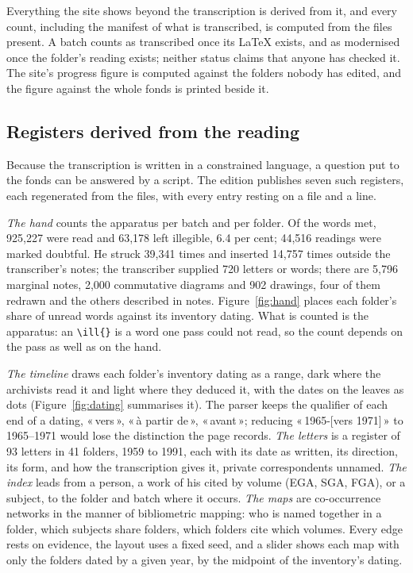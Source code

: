 \documentclass[11pt]{article}
\newcommand{\q}[1]{«\,#1\,»}
\begin{document}
Everything the site shows beyond the transcription is derived from it, and every count, including the manifest of what is transcribed, is computed from the files present. A batch counts as transcribed once its LaTeX exists, and as modernised once the folder's reading exists; neither status claims that anyone has checked it. The site's progress figure is computed against the folders nobody has edited, and the figure against the whole fonds is printed beside it.

\subsection{Registers derived from the reading}

Because the transcription is written in a constrained language, a question put to the fonds can be answered by a script. The edition publishes seven such registers, each regenerated from the files, with every entry resting on a file and a line.

\emph{The hand} counts the apparatus per batch and per folder. Of the words met, 925,227 were read and 63,178 left illegible, 6.4 per cent; 44,516 readings were marked doubtful. He struck 39,341 times and inserted 14,757 times outside the transcriber's notes; the transcriber supplied 720 letters or words; there are 5,796 marginal notes, 2,000 commutative diagrams and 902 drawings, four of them redrawn and the others described in notes. Figure~\ref{fig:hand} places each folder's share of unread words against its inventory dating. What is counted is the apparatus: an \texttt{\textbackslash ill\{\}} is a word one pass could not read, so the count depends on the pass as well as on the hand.



\emph{The timeline} draws each folder's inventory dating as a range, dark where the archivists read it and light where they deduced it, with the dates on the leaves as dots (Figure~\ref{fig:dating} summarises it). The parser keeps the qualifier of each end of a dating, \q{vers}, \q{à partir de}, \q{avant}; reducing \q{1965-[vers 1971]} to 1965--1971 would lose the distinction the page records. \emph{The letters} is a register of 93 letters in 41 folders, 1959 to 1991, each with its date as written, its direction, its form, and how the transcription gives it, private correspondents unnamed. \emph{The index} leads from a person, a work of his cited by volume (EGA, SGA, FGA), or a subject, to the folder and batch where it occurs. \emph{The maps} are co-occurrence networks in the manner of bibliometric mapping: who is named together in a folder, which subjects share folders, which folders cite which volumes. Every edge rests on evidence, the layout uses a fixed seed, and a slider shows each map with only the folders dated by a given year, by the midpoint of the inventory's dating.
\end{document}

